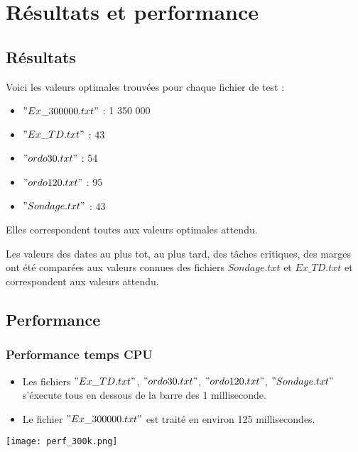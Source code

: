 \documentclass{article}
\begin{document}
\section{Résultats et performance}

\subsection{Résultats}

Voici les valeurs optimales trouvées pour chaque fichier de test :

\begin{itemize}
\item $"Ex\_300000.txt"$ : 1 350 000
\item $"Ex\_TD.txt"$ : 43
\item $"ordo30.txt"$ : 54
\item $"ordo120.txt"$ : 95
\item $"Sondage.txt"$ : 43
\end{itemize}

Elles correspondent toutes aux valeurs optimales attendu.

Les valeurs des dates au plus tot, au plus tard, des tâches critiques, des marges ont été comparées aux valeurs connues des fichiers $Sondage.txt$ et $Ex\_TD.txt$ et correspondent aux valeurs attendu.

\subsection{Performance}

\subsubsection{Performance temps CPU}

\begin{itemize}
\item Les fichiers $"Ex\_TD.txt"$, $"ordo30.txt"$, $"ordo120.txt"$, $"Sondage.txt"$ s'éxecute tous en dessous de la barre des 1 milliseconde.

\item Le fichier $"Ex\_300000.txt"$ est traité en environ 125 millisecondes.
\end{itemize}

\begin{center} 
\texttt{[image: perf\_300k.png]}
\end{center} 
\end{document}
